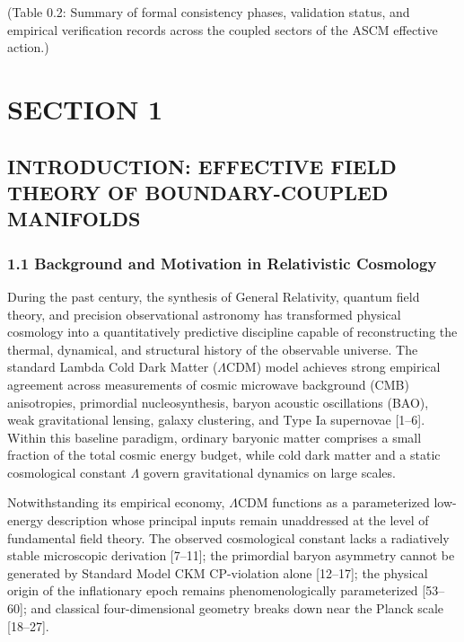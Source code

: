 \documentclass[aps,prd,onecolumn,superscriptaddress,nofootinbib,longbibliography,10pt]{revtex4-2}
\begin{document}
  (Table 0.2: Summary of formal consistency phases, validation status, and empirical verification records across the coupled sectors of the ASCM effective action.)




 

  
\section*{SECTION 1}

  
\subsection*{INTRODUCTION: EFFECTIVE FIELD THEORY OF BOUNDARY-COUPLED MANIFOLDS}

  
\subsubsection*{1.1 Background and Motivation in Relativistic Cosmology}

  During the past century, the synthesis of General Relativity, quantum field theory, and precision observational astronomy has transformed physical cosmology into a quantitatively predictive discipline capable of reconstructing the thermal, dynamical, and structural history of the observable universe. The standard Lambda Cold Dark Matter ($\Lambda$CDM) model achieves strong empirical agreement across measurements of cosmic microwave background (CMB) anisotropies, primordial nucleosynthesis, baryon acoustic oscillations (BAO), weak gravitational lensing, galaxy clustering, and Type Ia supernovae [1–6]. Within this baseline paradigm, ordinary baryonic matter comprises a small fraction of the total cosmic energy budget, while cold dark matter and a static cosmological constant \(\Lambda\) govern gravitational dynamics on large scales.


  Notwithstanding its empirical economy, $\Lambda$CDM functions as a parameterized low-energy description whose principal inputs remain unaddressed at the level of fundamental field theory. The observed cosmological constant lacks a radiatively stable microscopic derivation [7–11]; the primordial baryon asymmetry cannot be generated by Standard Model CKM CP-violation alone [12–17]; the physical origin of the inflationary epoch remains phenomenologically parameterized [53–60]; and classical four-dimensional geometry breaks down near the Planck scale [18–27].
\end{document}
